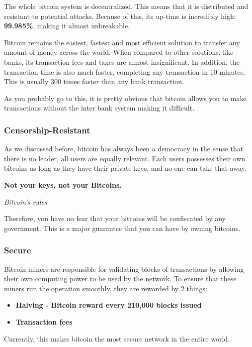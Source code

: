 \documentclass{article}
\newcommand\tab[1][1cm]{\hspace*{#1}}
\begin{document}
\tab The whole bitcoin system is decentralized. This means that it is distributed and resistant to potential attacks. Because of this, its up-time is incredibly high: \textbf{99.985\%}, making it almost unbreakable. 

Bitcoin remains the easiest, fastest and most efficient solution to transfer any amount of money across the world. When compared to other solutions, like banks, its transaction fees and taxes are almost insignificant. In addition, the transaction time is also much faster, completing any transaction in 10 minutes. This is usually 300 times faster than any bank transaction. 

As you probably go to this, it is pretty obvious that bitcoin allows you to make transactions without the inter bank system making it difficult.

\subsubsection{Censorship-Resistant}

\tab As we discussed before, bitcoin has always been a democracy in the sense that there is no leader, all users are equally relevant. Each users possesses their own bitcoins as long as they have their private keys, and no one can take that away. 

\renewcommand{\epigraphflush}{center}
\epigraph{\textbf{Not your keys, not your Bitcoins.}}{\textit{Bitcoin's rules}}

Therefore, you have no fear that your bitcoins will be confiscated by any government. This is a major guarantee that you can have by owning bitcoins.

\subsubsection{Secure}

\tab Bitcoin miners are responsible for validating blocks of transactions by allowing their own computing power to be used by the network. To ensure that these miners run the operation smoothly, they are rewarded by 2 things:

\begin{itemize}
    \item \textbf{Halving - Bitcoin reward every 210,000 blocks issued}
    \item \textbf{Transaction fees}
\end{itemize}

 Currently, this makes bitcoin the most secure network in the entire world. 
 
\end{document}

